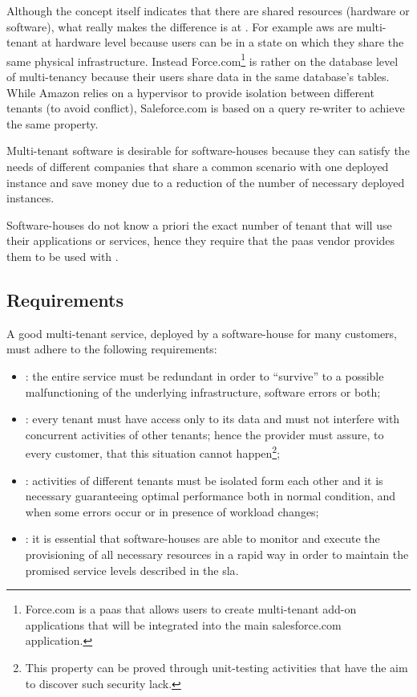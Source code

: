 Although the concept itself indicates that there are shared resources (hardware or software), what really
makes the difference is at . For example \ac{aws} are
multi-tenant at hardware level because users can be in a state on which they share the same physical
infrastructure. Instead Force.com\footnote{Force.com is a \ac{paas} that allows users to create
multi-tenant add-on applications that will be integrated into the main salesforce.com application.} is rather on
the database level of multi-tenancy because their users share data in the same database's tables. While
Amazon relies on a hypervisor to provide isolation between different tenants (to avoid conflict),
Saleforce.com is based on a query re-writer to achieve the same property.

Multi-tenant software is desirable for software-houses because they can satisfy the needs of different
companies that share a common scenario with one deployed instance and save money due to a reduction
of the number of necessary deployed instances. 

Software-houses do not know a priori the exact number of tenant that will use their applications or services,
hence they require that the \ac{paas} vendor provides them  to be used
with .

\subsection{Requirements}
\label{sec:elasticity-multiTenancy-requirements}
A good multi-tenant service, deployed by a software-house for many customers, must adhere to the following
requirements:

\begin{itemize}
	\item{: the entire service must be redundant in order to ``survive'' to a possible
		malfunctioning of the underlying infrastructure, software errors or both;}
	\item{: every tenant must have access only to its data and must not interfere
		with concurrent activities of other tenants; hence the provider must assure, to every customer, that this
		situation cannot happen\footnote{This property can be proved through unit-testing activities that have the
		aim to discover such security lack.};}
	\item{: activities of different tenants must be isolated form each other and it
		is necessary guaranteeing optimal performance both in normal condition, and when some errors occur or in
		presence of workload changes;}
	\item{: it is essential that software-houses are able to monitor and execute the
		provisioning of all necessary resources in a rapid way in order to maintain the promised service levels
		described in the \ac{sla}.}
\end{itemize}

